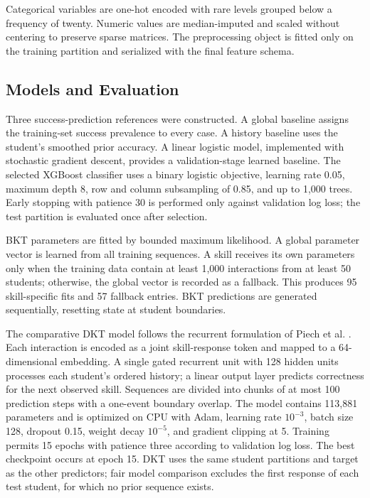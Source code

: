 \documentclass[conference]{IEEEtran}
\begin{document}
Categorical variables are one-hot encoded with rare levels grouped below a frequency of twenty. Numeric values are median-imputed and scaled without centering to preserve sparse matrices. The preprocessing object is fitted only on the training partition and serialized with the final feature schema.

\subsection{Models and Evaluation}
Three success-prediction references were constructed. A global baseline assigns the training-set success prevalence to every case. A history baseline uses the student's smoothed prior accuracy. A linear logistic model, implemented with stochastic gradient descent, provides a validation-stage learned baseline. The selected XGBoost classifier uses a binary logistic objective, learning rate 0.05, maximum depth 8, row and column subsampling of 0.85, and up to 1,000 trees. Early stopping with patience 30 is performed only against validation log loss; the test partition is evaluated once after selection.

BKT parameters are fitted by bounded maximum likelihood. A global parameter vector is learned from all training sequences. A skill receives its own parameters only when the training data contain at least 1,000 interactions from at least 50 students; otherwise, the global vector is recorded as a fallback. This produces 95 skill-specific fits and 57 fallback entries. BKT predictions are generated sequentially, resetting state at student boundaries.

The comparative DKT model follows the recurrent formulation of Piech et al. \cite{piech2015dkt}. Each interaction is encoded as a joint skill-response token and mapped to a 64-dimensional embedding. A single gated recurrent unit with 128 hidden units processes each student's ordered history; a linear output layer predicts correctness for the next observed skill. Sequences are divided into chunks of at most 100 prediction steps with a one-event boundary overlap. The model contains 113,881 parameters and is optimized on CPU with Adam, learning rate $10^{-3}$, batch size 128, dropout 0.15, weight decay $10^{-5}$, and gradient clipping at 5. Training permits 15 epochs with patience three according to validation log loss. The best checkpoint occurs at epoch 15. DKT uses the same student partitions and target as the other predictors; fair model comparison excludes the first response of each test student, for which no prior sequence exists.
\end{document}
